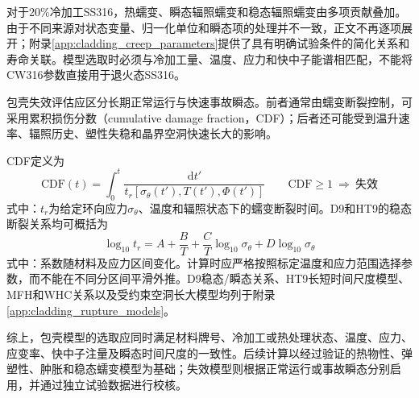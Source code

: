 对于20\%冷加工SS316，热蠕变、瞬态辐照蠕变和稳态辐照蠕变由多项贡献叠加。由于不同来源对状态变量、归一化单位和瞬态项的处理并不一致，正文不再逐项展开；附录\ref{app:cladding_creep_parameters}提供了具有明确试验条件的简化关系和寿命关联。模型选取时必须与冷加工量、温度、应力和快中子能谱相匹配，不能将CW316参数直接用于退火态SS316。

\label{sec:cladding_failure_models}

包壳失效评估应区分长期正常运行与快速事故瞬态。前者通常由蠕变断裂控制，可采用累积损伤分数（cumulative damage fraction，CDF）；后者还可能受到温升速率、辐照历史、塑性失稳和晶界空洞快速长大的影响\cite{FanningSAS4ASASSYS1Safety2017,KARAHAN2010283}。

CDF定义为
\begin{equation}
	\mathrm{CDF}(t)
	=\int_0^t
	\frac{\mathrm dt'}
	{t_r[\sigma_\theta(t'),T(t'),\Phi(t')]}
	\qquad
	\mathrm{CDF}\geq1\ \Longrightarrow\ \text{失效}
	\label{eq:clad_cumulative_damage_fraction}
\end{equation}
式中：$t_r$为给定环向应力$\sigma_\theta$、温度和辐照状态下的蠕变断裂时间。D9和HT9的稳态断裂关系均可概括为
\begin{equation}
	\log_{10}t_r
	=A+\frac{B}{T}
	+\frac{C}{T}\log_{10}\sigma_\theta
	+D\log_{10}\sigma_\theta
	\label{eq:clad_generic_rupture_time}
\end{equation}
式中：系数随材料及应力区间变化。计算时应严格按照标定温度和应力范围选择参数，而不能在不同分区间平滑外推。D9稳态/瞬态关系、HT9长短时间尺度模型、MFH和WHC关系以及受约束空洞长大模型均列于附录\ref{app:cladding_rupture_models}。

综上，包壳模型的选取应同时满足材料牌号、冷加工或热处理状态、温度、应力、应变率、快中子注量及瞬态时间尺度的一致性。后续计算以经过验证的热物性、弹塑性、肿胀和稳态蠕变模型为基础；失效模型则根据正常运行或事故瞬态分别启用，并通过独立试验数据进行校核。

